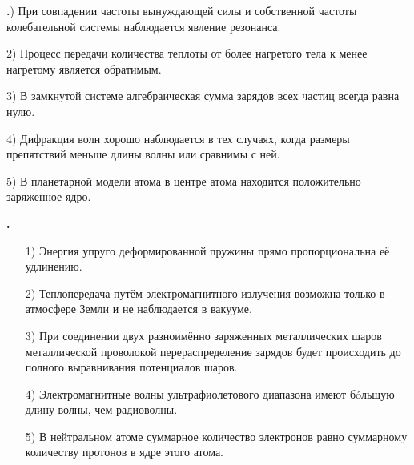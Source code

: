 \documentclass[12pt,a4paper]{article}
\newif\ifShowSolutions
\newcounter{banktask}
\newcommand{\BankTask}[3]{%
  \refstepcounter{banktask}%
  \Needspace{35mm}\par\medskip\noindent\begin{minipage}{\linewidth}%
  \noindent\textbf{\thebanktask.}\quad #2\par
  \ifShowSolutions
    #3\par
    \ifdefined\TutorEdition
      \ifcsname TutorSource#1\endcsname
        \smallskip{\small\csname TutorSource#1\endcsname\par}%
      \fi
    \fi
  \fi
  \end{minipage}\par\medskip
}
\begin{document}
\BankTask{970E28}{
1) При совпадении частоты вынуждающей силы и собственной частоты колебательной системы наблюдается явление резонанса.
\par
2) Процесс передачи количества теплоты от более нагретого тела к менее нагретому является обратимым.
\par
3) В замкнутой системе алгебраическая сумма зарядов всех частиц всегда равна нулю.
\par
4) Дифракция волн хорошо наблюдается в тех случаях, когда размеры препятствий меньше длины волны или сравнимы с ней.
\par
5) В планетарной модели атома в центре атома находится положительно заряженное ядро.
}{
\smallskip\noindent\textbf{Решение от GPT}\par
1) Верно: при совпадении частоты вынуждающей силы с собственной частотой системы возникает резонанс.
2) Неверно: самопроизвольная передача теплоты от более нагретого тела к менее нагретому необратима.
3) Неверно: в замкнутой системе суммарный заряд сохраняется, \(\sum_i q_i=\mathrm{const}\), но не обязательно равен нулю.
4) Верно: дифракция хорошо выражена при размерах препятствия \(d\lesssim\lambda\).
5) Верно: согласно планетарной модели в центре атома расположено положительно заряженное ядро; ответ: \(1,\ 4,\ 5\).
}

\BankTask{4B89D5}{
\begin{enumerate}
\item[1)] Энергия упруго деформированной пружины прямо пропорциональна её удлинению.
\item[2)] Теплопередача путём электромагнитного излучения возможна только в атмосфере Земли и не наблюдается в вакууме.
\item[3)] При соединении двух разноимённо заряженных металлических шаров металлической проволокой перераспределение зарядов будет происходить до полного выравнивания потенциалов шаров.
\item[4)] Электромагнитные волны ультрафиолетового диапазона имеют бóльшую длину волны, чем радиоволны.
\item[5)] В нейтральном атоме суммарное количество электронов равно суммарному количеству протонов в ядре этого атома.
\end{enumerate}
}{
\smallskip\noindent\textbf{Решение от GPT}\par
1) Неверно: энергия пружины \(E=\frac{kx^2}{2}\) пропорциональна квадрату удлинения. 2) Неверно: электромагнитное излучение переносит энергию и в вакууме. 3) Верно: перераспределение зарядов прекращается при равенстве потенциалов \(\varphi_1=\varphi_2\). 4) Неверно: длина волны ультрафиолетового излучения меньше длины радиоволн. 5) Верно: нейтральность атома означает \(N_e=N_p\). Ответ: \(35\).
}
\end{document}
